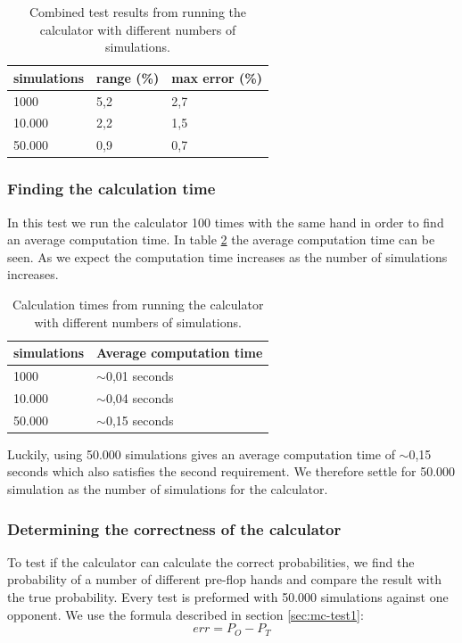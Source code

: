 \begin{table}[H]
  \center
  \begin{tabular}{ | l | l | l | }
    \hline
    simulations & range (\%) & max error (\%) \\
    \hline                       
    1000 & 5,2 & 2,7 \\
    10.000 & 2,2 & 1,5 \\
    50.000 & 0,9 & 0,7 \\
  \hline  
  \end{tabular}
  \caption{Combined test results from running the calculator with different numbers of simulations. \label{tab:mc-total}}
\end{table}
\vspace{4mm}

\subsubsection{Finding the calculation time}
In this test we run the calculator 100 times with the same hand in order to find an average computation time. 
In table \ref{tab:mc-time} the average computation time can be seen. As we expect the computation time increases as the number of simulations increases. 

\vspace{4mm}
\begin{table}[H]
  \center
  \begin{tabular}{ | l | l | }
    \hline
    simulations & Average computation time\\
    \hline                       
    1000 & $\sim$0,01 seconds\\
    10.000 & $\sim$0,04 seconds\\
    50.000 & $\sim$0,15 seconds\\
  \hline  
  \end{tabular}
  \caption{Calculation times from running the calculator with different numbers of simulations. \label{tab:mc-time}}
\end{table}
\vspace{4mm}

Luckily, using 50.000 simulations gives an average computation time of $\sim$0,15 seconds which also satisfies the second requirement. We therefore settle for 50.000 simulation as the number of simulations for the calculator.

\subsubsection{Determining the correctness of the calculator}
To test if the calculator can calculate the correct probabilities, we find the probability of a number of different pre-flop hands and compare the result with the true probability. Every test is preformed with 50.000 simulations against one opponent. We use the formula described in section \ref{sec:mc-test1}:
\[err = P_{O} - P_{T}\]

